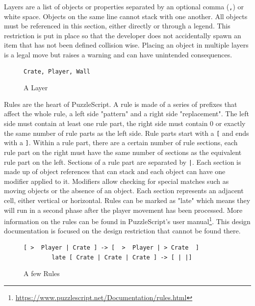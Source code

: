 Layers are a list of objects or properties separated by an optional comma (\texttt{,}) or white space. Objects on the same line cannot stack with one another. All objects must be referenced in this section, either directly or through a legend. This restriction is put in place so that the developer does not accidentally spawn an item that has not been defined collision wise. Placing an object in multiple layers is a legal move but raises a warning and can have unintended consequences.

\begin{figure}
    \centering
    \begin{lstlisting}[language=PuzzleScript]
        Crate, Player, Wall
    \end{lstlisting}
    \caption{A Layer}
    \label{fig:layer_code_old}
\end{figure}

Rules are the heart of PuzzleScript. A rule is made of a series of prefixes that affect the whole rule, a left side "pattern" and a right side "replacement". The left side must contain at least one rule part, the right side must contain 0 or exactly the same number of rule parts as the left side.  Rule parts start with a \texttt{[} and ends with a \texttt{]}. Within a rule part, there are a certain number of rule sections, each rule part on the right must have the same number of sections as the equivalent rule part on the left. Sections of a rule part are separated by \texttt{|}. Each section is made up of object references that can stack and each object can have one modifier applied to it. Modifiers allow checking for special matches such as moving objects or the absence of an object. Each section represents an adjacent cell, either vertical or horizontal. Rules can be marked as "late" which means they will run in a second phase after the player movement has been processed. More information on the rules can be found in PuzzleScript's user manual\footnote{\url{https://www.puzzlescript.net/Documentation/rules.html}}. This design documentation is focused on the design restriction that cannot be found there.

\begin{figure}
    \centering
    \begin{lstlisting}[language=PuzzleScript]
        [ >  Player | Crate ] -> [  >  Player | > Crate  ]
        late [ Crate | Crate | Crate ] -> [ | |]
    \end{lstlisting}
    \caption{A few Rules}
    \label{fig:rule_code_old}
\end{figure}

